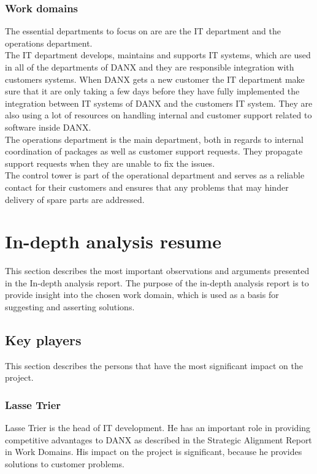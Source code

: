 \subsubsection{Work domains}
The essential departments to focus on are are the IT department and the operations department.\\
The IT department develops, maintains and supports IT systems\cite{lasse015}, which are used in all of the departments of DANX and they are responsible integration with customers systems\cite{lasse008}. When DANX gets a new customer the IT department make sure that it are only taking a few days\cite{lasse008} before they have fully implemented the integration between IT systems of DANX and the customers IT system. They are also using a lot of resources on handling internal and customer support related to software inside DANX.\cite{lasse016}\\
The operations department is the main department, both in regards to internal coordination of packages as well as customer support requests.\cite{gert004} They propagate support requests when they are unable to fix the issues.\cite{lasse017}\\
The control tower is part of the operational department and serves as a reliable contact for their customers and ensures that any problems that may hinder delivery of spare parts are addressed\cite{gert004}.\\

\section{In-depth analysis resume}
This section describes the most important observations and arguments presented in the In-depth analysis report. The purpose of the in-depth analysis report is to provide insight into the chosen work domain, which is used as a basis for suggesting and asserting solutions.

\subsection{Key players}
This section describes the persons that have the most significant impact on the project.

\subsubsection{Lasse Trier}
Lasse Trier is the head of IT development. He has an important role in providing competitive advantages to DANX as described in the Strategic Alignment Report in Work Domains. His impact on the project is significant, because he provides solutions to customer problems.

